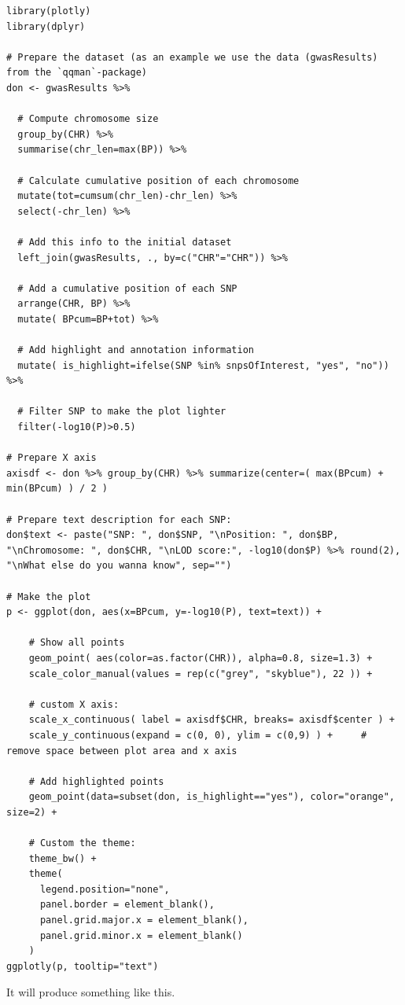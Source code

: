 \documentclass[
]{book}
\begin{document}
\begin{verbatim}
library(plotly)
library(dplyr)

# Prepare the dataset (as an example we use the data (gwasResults) from the `qqman`-package)
don <- gwasResults %>%

  # Compute chromosome size
  group_by(CHR) %>%
  summarise(chr_len=max(BP)) %>%

  # Calculate cumulative position of each chromosome
  mutate(tot=cumsum(chr_len)-chr_len) %>%
  select(-chr_len) %>%

  # Add this info to the initial dataset
  left_join(gwasResults, ., by=c("CHR"="CHR")) %>%

  # Add a cumulative position of each SNP
  arrange(CHR, BP) %>%
  mutate( BPcum=BP+tot) %>%

  # Add highlight and annotation information
  mutate( is_highlight=ifelse(SNP %in% snpsOfInterest, "yes", "no")) %>%

  # Filter SNP to make the plot lighter
  filter(-log10(P)>0.5)

# Prepare X axis
axisdf <- don %>% group_by(CHR) %>% summarize(center=( max(BPcum) + min(BPcum) ) / 2 )

# Prepare text description for each SNP:
don$text <- paste("SNP: ", don$SNP, "\nPosition: ", don$BP, "\nChromosome: ", don$CHR, "\nLOD score:", -log10(don$P) %>% round(2), "\nWhat else do you wanna know", sep="")

# Make the plot
p <- ggplot(don, aes(x=BPcum, y=-log10(P), text=text)) +

    # Show all points
    geom_point( aes(color=as.factor(CHR)), alpha=0.8, size=1.3) +
    scale_color_manual(values = rep(c("grey", "skyblue"), 22 )) +

    # custom X axis:
    scale_x_continuous( label = axisdf$CHR, breaks= axisdf$center ) +
    scale_y_continuous(expand = c(0, 0), ylim = c(0,9) ) +     # remove space between plot area and x axis

    # Add highlighted points
    geom_point(data=subset(don, is_highlight=="yes"), color="orange", size=2) +

    # Custom the theme:
    theme_bw() +
    theme(
      legend.position="none",
      panel.border = element_blank(),
      panel.grid.major.x = element_blank(),
      panel.grid.minor.x = element_blank()
    )
ggplotly(p, tooltip="text")
\end{verbatim}

It will produce something like this.
\end{document}
